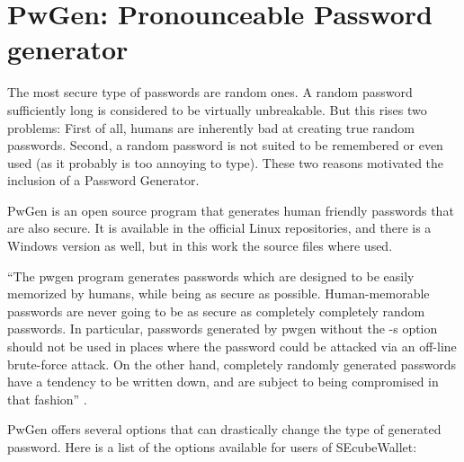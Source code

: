 \section{PwGen: Pronounceable Password generator}

The most secure type of passwords are random ones. A random password sufficiently long is considered to be virtually unbreakable. But this rises two problems: First of all, humans are inherently bad at creating true random passwords. Second, a random password is not suited to be remembered or even used (as it probably is too annoying to type). These two reasons motivated the inclusion of a Password Generator.

PwGen \cite{pwgen} is an open source program that generates human friendly passwords that are also secure. It is available in the official Linux repositories, and there is a Windows version as well, but in this work the source files where used.

``The pwgen program generates passwords which are designed to be easily memorized by humans, while being as secure as possible. Human-memorable passwords are never going to be as secure as completely completely random passwords. In particular, passwords generated by pwgen without the -s option should not be used in places where the password could be attacked via an off-line brute-force attack. On the other hand, completely randomly generated passwords have a tendency to be written down, and are subject to being compromised in that fashion'' \cite{pwgen}.

PwGen offers several options that can drastically change the type of generated password. Here is a list of the options available for users of SEcubeWallet:

